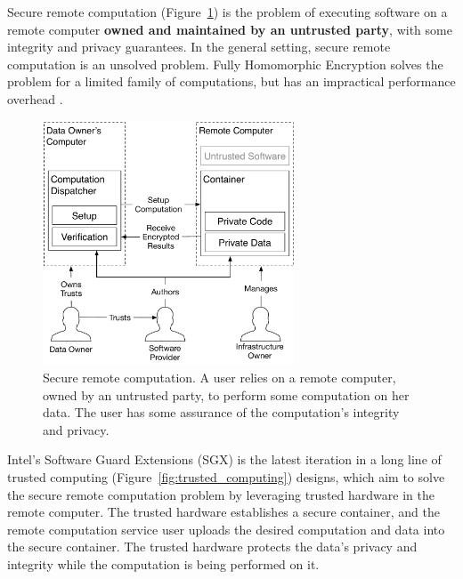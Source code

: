 \label{sec:intro}

Secure remote computation (Figure~\ref{fig:remote_computation}) is the problem
of executing software on a remote computer \textbf{owned and maintained by an
untrusted party}, with some integrity and privacy guarantees. In the general
setting, secure remote computation is an unsolved problem. Fully Homomorphic
Encryption \cite{gentry2009fhe} solves the problem for a limited family of
computations, but has an impractical performance overhead
\cite{naehrig2011can}.

\begin{figure}[hbt]
  \centering
  \includegraphics[width=75mm]{figures/remote_computation.pdf}
  \caption{
    Secure remote computation. A user relies on a remote computer, owned by an
    untrusted party, to perform some computation on her data. The user has some
    assurance of the computation's integrity and privacy.
  }
  \label{fig:remote_computation}
\end{figure}

Intel's Software Guard Extensions (SGX) is the latest iteration in a long line
of trusted computing (Figure~\ref{fig:trusted_computing}) designs, which aim to
solve the secure remote computation problem by leveraging trusted hardware in
the remote computer. The trusted hardware establishes a secure container, and
the remote computation service user uploads the desired computation and data
into the secure container. The trusted hardware protects the data's privacy
and integrity while the computation is being performed on it.

